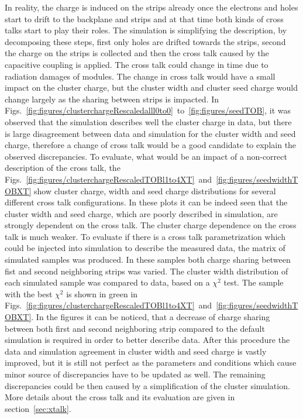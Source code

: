 In reality, the charge is induced on the strips already once the electrons and holes start to drift to the backplane and strips and at that time both kinds of cross talks start to play their roles. The simulation is simplifying the description, by decomposing these steps, first only holes are drifted towards the strips, second the charge on the strips is collected and then the cross talk caused by the capacitive coupling is applied. The cross talk could change in time due to radiation damages of modules. The change in cross talk would have a small impact on the cluster charge, but the cluster width and cluster seed charge would change largely as the sharing between strips is impacted. In Figs.~\ref{fig:figures/clusterchargeRescaledalll0to0}~to~\ref{fig:figures/seedTOB}, it was observed that the simulation describes well the cluster charge in data, but there is large disagreement between data and simulation for the cluster width and seed charge, therefore a change of cross talk would be a good candidate to explain the observed discrepancies.  To evaluate, what would be an impact of a non-correct description of the cross talk, the Figs.~\ref{fig:figures/clusterchargeRescaledTOBl1to4XT}~and~\ref{fig:figures/seedwidthTOBXT} show cluster charge, width and seed charge distributions for several different cross talk configurations. In these plots it can be indeed seen that the cluster width and seed charge, which are poorly described in simulation, are strongly dependent on the cross talk. The cluster charge dependence on  the cross talk is much weaker. To evaluate if there is a cross talk parametrization which could be injected into simulation to describe the measured data, the matrix of simulated samples was produced. In these samples both charge sharing between fist and second neighboring strips was varied. The cluster width distribution of each simulated sample was compared to data, based on a $\chi^{2}$ test. The sample with the best $\chi^{2}$ is shown in green in Figs.~\ref{fig:figures/clusterchargeRescaledTOBl1to4XT}~and~\ref{fig:figures/seedwidthTOBXT}. In the figures it can be noticed, that a decrease of charge sharing between both first and second neighboring strip compared to the default simulation is required in order to better describe data. After this procedure the data and simulation agreement in cluster width and seed charge is vastly improved, but it is still not perfect as the parameters and conditions which cause minor source of discrepancies have to be updated as well. The remaining discrepancies could be then caused by a simplification of the cluster simulation. More details about the cross talk and its evaluation are given in section~\ref{sec:xtalk}.


